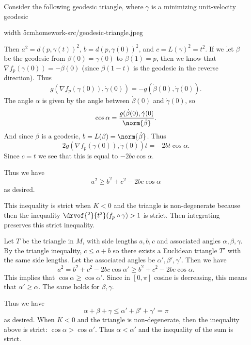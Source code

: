     Consider the following geodesic triangle, where $\gamma$ is a minimizing unit-velocity geodesic

    \pdfximage width 5cm{homework-src/geodesic-triangle.jpeg}
    \centerline{\pdfrefximage\pdflastximage}

    Then $a^2=d(p,\gamma(t))^2$, $b=d(p,\gamma(0))^2$, and $c=L(\gamma)^2=t^2$.
    If we let $\beta$ be the geodesic from $\beta(0)=\gamma(0)$ to $\beta(1)=p$, then we know that
    $\nabla f_p(\gamma(0))=-\dot\beta(0)$ (since $\beta(1-t)$ is the geodesic in the reverse direction).
    Thus
    $$ g(\nabla f_p(\gamma(0)),\dot\gamma(0)) = -g(\dot\beta(0),\dot\gamma(0)) . $$
    The angle $\alpha$ is given by the angle between $\dot\beta(0)$ and $\dot\gamma(0)$, so
    $$ \cos\alpha = \frac{g(\dot\beta(0),\dot\gamma(0)}{\norm{\dot\beta}} . $$
    And since $\beta$ is a geodesic, $b=L(\beta)=\norm{\dot\beta}$.
    Thus
    $$ 2g(\nabla f_p(\gamma(0)),\dot\gamma(0))t = -2bt\cos\alpha . $$
    Since $c=t$ we see that this is equal to $-2bc\cos\alpha$.

    Thus we have
    $$ a^2 \geq b^2 + c^2 - 2bc\cos\alpha $$
    as desired.

    This inequality is strict when $K<0$ and the triangle is non-degenerate because then the inequality
    $\drvof{^2}{t^2}(f_p\circ\gamma)>1$ is strict.
    Then integrating preserves this strict inequality.

    \item Let $T$ be the triangle in $M$, with side lengths $a,b,c$ and associated angles $\alpha,\beta,\gamma$.
    By the triangle inequality, $c\leq a+b$ so there exists a Euclidean triangle $T'$ with the same side lengths.
    Let the associated angles be $\alpha',\beta',\gamma'$.
    Then we have
    $$ a^2 = b^2 + c^2 - 2bc\cos\alpha' \geq b^2 + c^2 - 2bc\cos\alpha . $$
    This implies that $\cos\alpha\geq\cos\alpha'$.
    Since in $[0,\pi]$ cosine is decreasing, this means that $\alpha'\geq\alpha$.
    The same holds for $\beta,\gamma$.

    Thus we have
    $$ \alpha + \beta + \gamma \leq \alpha' + \beta' + \gamma' = \pi $$
    as desired.
    When $K<0$ and the triangle is non-degenerate, then the inequality above is strict: $\cos\alpha>\cos\alpha'$.
    Thus $\alpha<\alpha'$ and the inequality of the sum is strict.
\eenum



